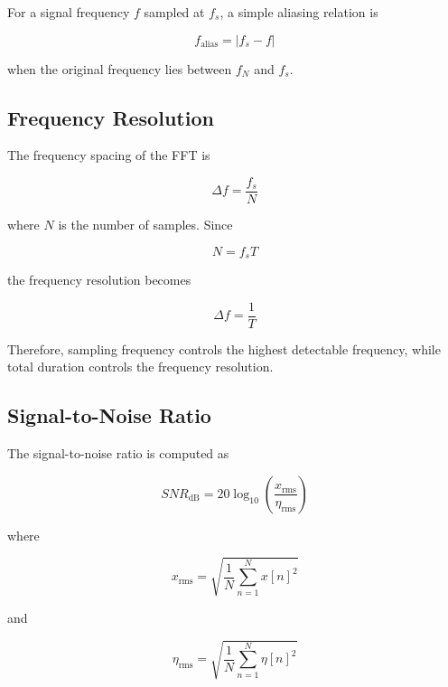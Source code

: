\documentclass[11pt,a4paper]{article}
\begin{document}
For a signal frequency \(f\) sampled at \(f_s\), a simple aliasing relation is

\begin{equation}
f_{\text{alias}} = |f_s - f|
\end{equation}

when the original frequency lies between \(f_N\) and \(f_s\).

\subsection{Frequency Resolution}

The frequency spacing of the FFT is

\begin{equation}
\Delta f = \frac{f_s}{N}
\end{equation}

where \(N\) is the number of samples. Since

\begin{equation}
N = f_s T
\end{equation}

the frequency resolution becomes

\begin{equation}
\Delta f = \frac{1}{T}
\end{equation}

Therefore, sampling frequency controls the highest detectable frequency, while total duration controls the frequency resolution.

\subsection{Signal-to-Noise Ratio}

The signal-to-noise ratio is computed as

\begin{equation}
SNR_{\text{dB}} = 20\log_{10}\left(\frac{x_{\text{rms}}}{\eta_{\text{rms}}}\right)
\end{equation}

where

\begin{equation}
x_{\text{rms}} = \sqrt{\frac{1}{N}\sum_{n=1}^{N}x[n]^2}
\end{equation}

and

\begin{equation}
\eta_{\text{rms}} = \sqrt{\frac{1}{N}\sum_{n=1}^{N}\eta[n]^2}
\end{equation}
\end{document}
